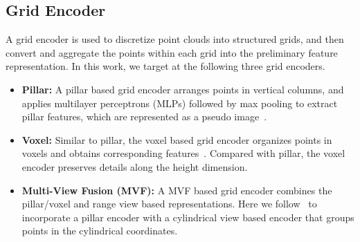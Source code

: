 \documentclass[10pt,twocolumn,letterpaper]{article}
\begin{document}
\subsection{Grid Encoder} 
\label{grid-encoder}
A grid encoder is used to discretize point clouds into structured grids, and then convert and aggregate the points within each grid into the preliminary feature representation. In this work, we target at the following three grid encoders. 

\begin{itemize}[noitemsep,topsep=0pt]
\item \textbf{Pillar:} A pillar based grid encoder arranges points in vertical columns, and applies multilayer perceptrons (MLPs) followed by max pooling to extract pillar features, which are represented as a pseudo image~\cite{lang2019pointpillars}. 
\item \textbf{Voxel:} Similar to pillar, the voxel based grid encoder organizes points in voxels and obtains corresponding features~\cite{zhou2018voxelnet}. Compared with pillar, the voxel encoder preserves details along the height dimension.  
\item \textbf{Multi-View Fusion (MVF):} A MVF based grid encoder combines the pillar/voxel and range view based representations. Here we follow~\cite{wang2020pillar} to incorporate a pillar encoder with a cylindrical view based encoder that groups points in the cylindrical coordinates.     
\end{itemize}
\end{document}
